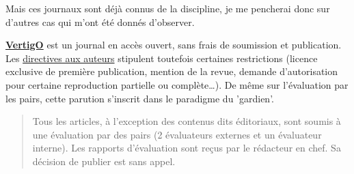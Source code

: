Mais ces journaux sont déjà connus de la discipline, je me pencherai donc sur d'autres cas qui m'ont été donnés d'observer.

\textbf{\href{http://www.openedition.org/2033}{VertigO}} est un journal en accès ouvert, sans frais de soumission et publication.
Les \href{http://vertigo.revues.org/5401#tocto1n6}{directives aux auteurs} stipulent toutefois certaines restrictions (licence exclusive de première publication, mention de la revue, demande d'autorisation pour certaine reproduction partielle ou complète\ldots).
{%
%
%
%
}
De même sur l'évaluation par les pairs, cette parution s'inscrit dans le paradigme du 'gardien'.
\blockcquote{_directives_2009}{
Tous les articles, à l'exception des contenus dits éditoriaux, sont soumis à une évaluation par des pairs (2 évaluateurs externes et un évaluateur interne).
Les rapports d'évaluation sont reçus par le rédacteur en chef.
Sa décision de publier est sans appel.}

